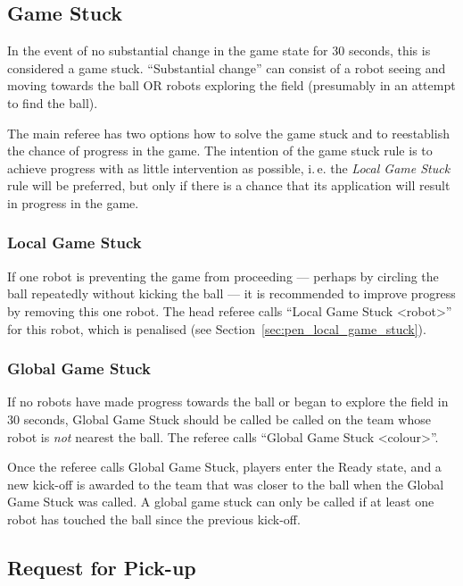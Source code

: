 \documentclass[12pt]{article}
\newcommand{\ie}{\mbox{i.\,e.}\xspace}
\newcommand{\cf}{see\xspace}
\begin{document}
\subsection{Game Stuck}
\label{sec:game_stuck}

In the event of no substantial change in the game state for 30 seconds, this is considered a game stuck.  ``Substantial change'' can consist of a robot seeing and moving towards the ball OR robots exploring the field (presumably in an attempt to find the ball).

The main referee has two options how to solve the game stuck and to reestablish the chance of progress in the game. The intention of the game stuck rule is to achieve progress with as little intervention as possible, \ie the \emph{Local Game Stuck} rule will be preferred, but only if there is a chance that its application will result in progress in the game.

\subsubsection{Local Game Stuck}
\label{sec:game_stuck:local}

If one robot is preventing the game from proceeding --- perhaps by circling the ball repeatedly without kicking the ball --- it is recommended to improve progress by removing this one robot.
The head referee calls ``Local Game Stuck \textless robot\textgreater'' for this robot, which is penalised (\cf Section~\ref{sec:pen_local_game_stuck}).

\subsubsection{Global Game Stuck}
\label{sec:game_stuck:global}

If no robots have made progress towards the ball or began to explore the field in 30 seconds, Global Game Stuck should be called be called on the team whose robot is \textit{not} nearest the ball.
The referee calls ``Global Game Stuck \textless colour\textgreater''.

Once the referee calls Global Game Stuck, players enter the Ready state, and a new kick-off is awarded to the team that was closer to the ball when the Global Game Stuck was called. A global game stuck can only be called if at least one robot has touched the ball since the previous kick-off.

\subsection{Request for Pick-up}
\label{sec:request_for_pickup}
\end{document}
